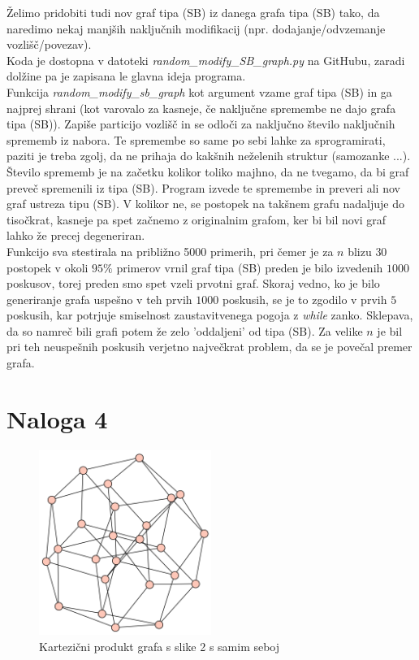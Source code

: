 \documentclass{article}
\begin{document}
Želimo pridobiti tudi nov graf tipa (SB) iz danega grafa tipa (SB) tako, 
da naredimo nekaj manjših naključnih modifikacij (npr. dodajanje/odvzemanje 
vozlišč/povezav). 
\\
Koda je dostopna v datoteki \textit{random\_modify\_SB\_graph.py} na GitHubu, zaradi 
dolžine pa je zapisana le glavna ideja programa. 
\\Funkcija \textit{random\_modify\_sb\_graph} kot argument vzame graf tipa (SB) in 
ga najprej shrani (kot varovalo za kasneje, če naključne spremembe ne dajo 
grafa tipa (SB)). Zapiše particijo vozlišč in se odloči za naključno število 
naključnih sprememb iz nabora. Te spremembe so same po sebi lahke za sprogramirati, paziti 
je treba zgolj, da ne prihaja do kakšnih neželenih struktur (samozanke ...). Število sprememb je na začetku kolikor toliko majhno, da ne tvegamo,
da bi graf preveč spremenili iz tipa (SB). Program izvede te spremembe in preveri ali nov graf ustreza tipu (SB).
V kolikor ne, se postopek na takšnem grafu nadaljuje do tisočkrat, kasneje pa 
spet začnemo z originalnim grafom, ker bi bil novi graf lahko že precej degeneriran.
\\
Funkcijo sva stestirala na približno 5000 primerih, pri čemer je za $n$ blizu $30$ postopek 
v okoli $95 \%$ primerov vrnil graf tipa (SB) preden je bilo izvedenih $1000$ poskusov, torej preden smo  
spet vzeli prvotni graf. Skoraj vedno, ko je bilo generiranje grafa uspešno v teh prvih $1000$ poskusih,
se je to zgodilo v prvih $5$ poskusih, kar potrjuje smiselnost zaustavitvenega pogoja z \emph{while} zanko.
Sklepava, da so namreč bili grafi potem že zelo 'oddaljeni' od tipa (SB). Za velike $n$ je bil pri teh neuspešnih 
poskusih verjetno največkrat problem, da se je povečal premer grafa.

\section{Naloga 4}


\begin{figure}[h!]
    \centering
    \includegraphics[width=0.5\textwidth]{sb_min_cartesian_example.png} %
    \caption{Kartezični produkt grafa s slike 2 s samim seboj}
    
\end{figure}
\end{document}
